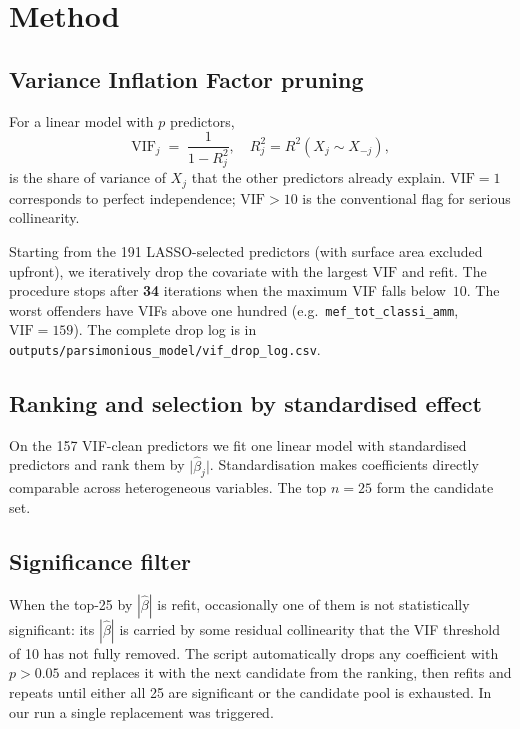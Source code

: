 \documentclass[11pt,a4paper]{article}
\begin{document}
\section{Method}

\subsection{Variance Inflation Factor pruning}

For a linear model with $p$ predictors,
\begin{equation}
  \mathrm{VIF}_j \;=\; \frac{1}{1 - R^{2}_{j}},
  \quad
  R^{2}_{j} = R^{2}\!\left(X_j \sim X_{-j}\right),
\end{equation}
is the share of variance of $X_j$ that the other predictors already
explain. $\mathrm{VIF}=1$ corresponds to perfect independence;
$\mathrm{VIF}>10$ is the conventional flag for serious collinearity.

Starting from the 191 LASSO-selected predictors (with surface area
excluded upfront), we iteratively drop the covariate with the largest
$\mathrm{VIF}$ and refit. The procedure stops after \textbf{34}
iterations when the maximum VIF falls below~$10$. The worst offenders
have VIFs above one hundred (e.g.\ \texttt{mef\_tot\_classi\_amm},
$\mathrm{VIF}=159$). The complete drop log is in
\verb|outputs/parsimonious_model/vif_drop_log.csv|.

\subsection{Ranking and selection by standardised effect}

On the 157 VIF-clean predictors we fit one linear model with
standardised predictors and rank them by $\lvert\hat\beta_j\rvert$.
Standardisation makes coefficients directly comparable across
heterogeneous variables. The top $n=25$ form the candidate set.

\subsection{Significance filter}

When the top-25 by $|\hat\beta|$ is refit, occasionally one of them is
not statistically significant: its $|\hat\beta|$ is carried by some
residual collinearity that the VIF threshold of 10 has not fully
removed. The script automatically drops any coefficient with $p>0.05$
and replaces it with the next candidate from the ranking, then refits
and repeats until either all 25 are significant or the candidate pool
is exhausted. In our run a single replacement was triggered.
\end{document}
